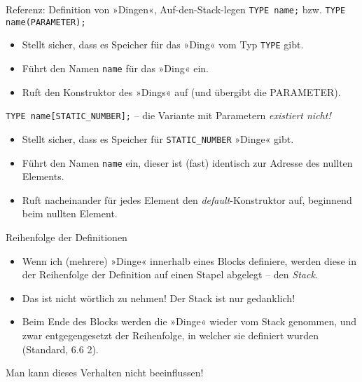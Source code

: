{
\begin{frame}[fragile]{Referenz: Definition von »Dingen«, Auf-den-Stack-legen}
	\verb|TYPE name;| \hspace{1em} bzw. \hspace{1em} \verb|TYPE name(PARAMETER);|
	\begin{itemize}
		\item Stellt sicher, dass es Speicher für das »Ding« vom Typ \verb|TYPE| gibt.
		\item Führt den Namen \verb|name| für das »Ding« ein.
		\item Ruft den Konstruktor des »Dings« auf (und übergibt die PARAMETER).
	\end{itemize}
	
	\vspace{1em}
	
	\verb|TYPE name[STATIC_NUMBER];| -- die Variante mit Parametern \emph{existiert nicht!}
	\begin{itemize}
		\item Stellt sicher, dass es Speicher für \verb|STATIC_NUMBER| »Dinge« gibt.
		\item Führt den Namen \verb|name| ein, dieser ist (fast) identisch zur Adresse des nullten Elements.
		\item Ruft nacheinander für jedes Element den \emph{default}-Konstruktor auf, beginnend beim nullten Element.
	\end{itemize}
\end{frame}
}

\begin{frame}{Reihenfolge der Definitionen}
	\begin{itemize}
		\item Wenn ich (mehrere) »Dinge« innerhalb eines Blocks definiere, werden diese in der Reihenfolge der Definition auf einen Stapel abgelegt -- den \emph{Stack}.
		\item Das ist nicht wörtlich zu nehmen! Der Stack ist nur gedanklich!
		\item<2-> Beim Ende des Blocks werden die »Dinge« wieder vom Stack genommen, und zwar entgegengesetzt der Reihenfolge, in welcher sie definiert wurden (Standard, 6.6 2).
	\end{itemize}
	
	\vspace{1em}
	
	\alert<3>{Man kann dieses Verhalten nicht beeinflussen!}
\end{frame}

